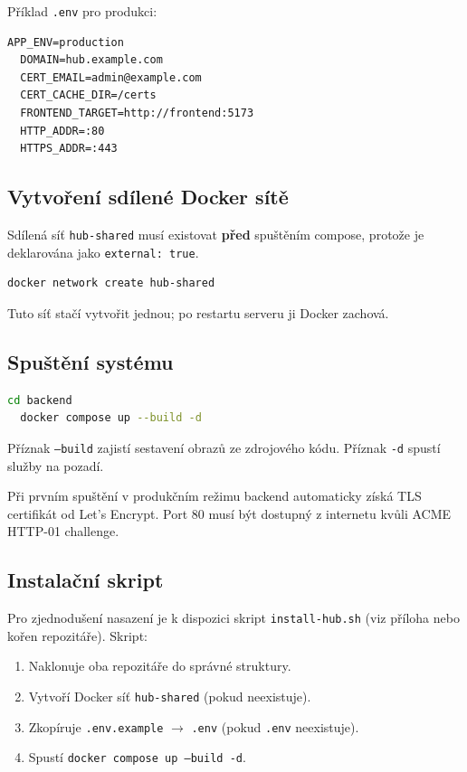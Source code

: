 \documentclass[12pt,a4paper]{article}
\begin{document}
Příklad \texttt{.env} pro produkci:

\begin{lstlisting}[caption={Příklad .env pro produkci}]
  APP_ENV=production
  DOMAIN=hub.example.com
  CERT_EMAIL=admin@example.com
  CERT_CACHE_DIR=/certs
  FRONTEND_TARGET=http://frontend:5173
  HTTP_ADDR=:80
  HTTPS_ADDR=:443
\end{lstlisting}

\subsection{Vytvoření sdílené Docker sítě}

Sdílená síť \texttt{hub-shared} musí existovat \textbf{před} spuštěním compose, protože je deklarována jako \texttt{external: true}.

\begin{lstlisting}[language=bash]
  docker network create hub-shared
\end{lstlisting}

Tuto síť stačí vytvořit jednou; po restartu serveru ji Docker zachová.

\subsection{Spuštění systému}

\begin{lstlisting}[language=bash, caption={Sestaveni a spusteni hub (backend + frontend)}]
  cd backend
  docker compose up --build -d
\end{lstlisting}

Příznak \texttt{--build} zajistí sestavení obrazů ze zdrojového kódu. Příznak \texttt{-d} spustí služby na pozadí.

\begin{infobox}
Při prvním spuštění v produkčním režimu backend automaticky získá TLS certifikát od Let's Encrypt. Port 80 musí být dostupný z internetu kvůli ACME HTTP-01 challenge.
\end{infobox}

\subsection{Instalační skript}

Pro zjednodušení nasazení je k dispozici skript \texttt{install-hub.sh} (viz příloha nebo kořen repozitáře). Skript:

\begin{enumerate}[label=\arabic*.]
  \item Naklonuje oba repozitáře do správné struktury.
  \item Vytvoří Docker síť \texttt{hub-shared} (pokud neexistuje).
  \item Zkopíruje \texttt{.env.example} $\rightarrow$ \texttt{.env} (pokud \texttt{.env} neexistuje).
  \item Spustí \texttt{docker compose up --build -d}.
\end{enumerate}
\end{document}
